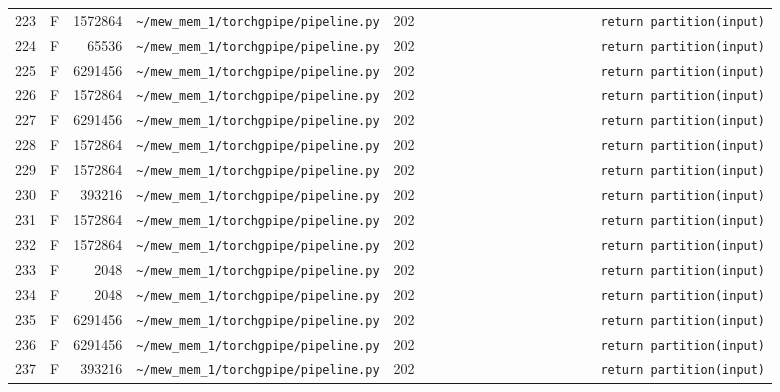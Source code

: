 \documentclass{article}
\begin{document}
\begin{longtable}{r l r p{6.5cm} r p{7.0cm}}
223 & F & 1572864 & \lstinline|~/mew_mem_1/torchgpipe/pipeline.py| & 202 & \lstinline|                        return partition(input)| \\
224 & F & 65536 & \lstinline|~/mew_mem_1/torchgpipe/pipeline.py| & 202 & \lstinline|                        return partition(input)| \\
225 & F & 6291456 & \lstinline|~/mew_mem_1/torchgpipe/pipeline.py| & 202 & \lstinline|                        return partition(input)| \\
226 & F & 1572864 & \lstinline|~/mew_mem_1/torchgpipe/pipeline.py| & 202 & \lstinline|                        return partition(input)| \\
227 & F & 6291456 & \lstinline|~/mew_mem_1/torchgpipe/pipeline.py| & 202 & \lstinline|                        return partition(input)| \\
228 & F & 1572864 & \lstinline|~/mew_mem_1/torchgpipe/pipeline.py| & 202 & \lstinline|                        return partition(input)| \\
229 & F & 1572864 & \lstinline|~/mew_mem_1/torchgpipe/pipeline.py| & 202 & \lstinline|                        return partition(input)| \\
230 & F & 393216 & \lstinline|~/mew_mem_1/torchgpipe/pipeline.py| & 202 & \lstinline|                        return partition(input)| \\
231 & F & 1572864 & \lstinline|~/mew_mem_1/torchgpipe/pipeline.py| & 202 & \lstinline|                        return partition(input)| \\
232 & F & 1572864 & \lstinline|~/mew_mem_1/torchgpipe/pipeline.py| & 202 & \lstinline|                        return partition(input)| \\
233 & F & 2048 & \lstinline|~/mew_mem_1/torchgpipe/pipeline.py| & 202 & \lstinline|                        return partition(input)| \\
234 & F & 2048 & \lstinline|~/mew_mem_1/torchgpipe/pipeline.py| & 202 & \lstinline|                        return partition(input)| \\
235 & F & 6291456 & \lstinline|~/mew_mem_1/torchgpipe/pipeline.py| & 202 & \lstinline|                        return partition(input)| \\
236 & F & 6291456 & \lstinline|~/mew_mem_1/torchgpipe/pipeline.py| & 202 & \lstinline|                        return partition(input)| \\
237 & F & 393216 & \lstinline|~/mew_mem_1/torchgpipe/pipeline.py| & 202 & \lstinline|                        return partition(input)| \\

\end{longtable}
\end{document}
